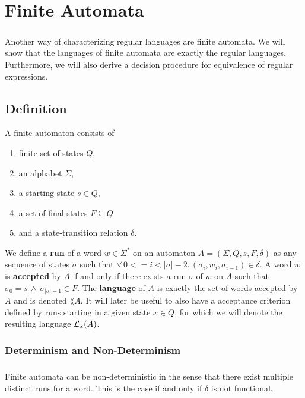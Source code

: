 
\chapter{Finite Automata}
\paragraph{} 
Another way of characterizing regular languages are finite automata. 
We will show that the languages of finite automata are exactly the regular languages. 
Furthermore, we will also derive a decision procedure for equivalence of regular expressions.

\section{Definition}
A finite automaton consists of
\begin{enumerate}
    \item
        finite set of states $Q$, 
    \item 
        an alphabet $\Sigma$, 
    \item 
        a starting state $s \in Q$, 
    \item 
        a set of final states $F \subseteq Q$ 
    \item 
        and a state-transition relation $\delta$. \cite{DBLP:books/daglib/0011126}
\end{enumerate}

We define a \textbf{run} of a word $w \in \Sigma^*$ on an automaton $A = (\Sigma, Q, s, F, \delta)$ as any sequence of states $\sigma$ such that 
$\forall \, 0 <= i < \vert\sigma\vert-2. \, (\sigma_i, w_i, \sigma_{i-1}) \in \delta$.
A word $w$ is \textbf{accepted} by $A$ if and only if there exists a run $\sigma$ of $w$ on $A$ such that $\sigma_0 = s \, \wedge \, \sigma_{\vert\sigma\vert-1} \in F$.
The \textbf{language} of $A$ is exactly the set of words accepted by $A$ and is denoted $\lang{A}$. 
It will later be useful to also have a acceptance criterion defined by runs starting in a given state $x \in Q$, for which we will denote the resulting language $\mathcal{L}_{x}(A)$.

\subsection{Determinism and Non-Determinism}

\paragraph{} 
Finite automata can be non-deterministic in the sense that there exist multiple distinct runs for a word. 
This is the case if and only if $\delta$ is not functional.

